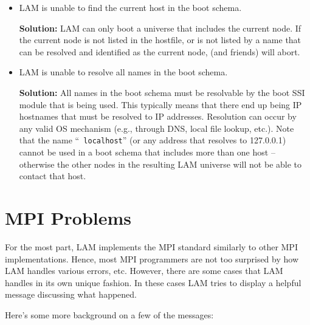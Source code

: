 \begin{itemize}
\item LAM is unable to find the current host in the boot schema.

  {\bf Solution:} LAM can only boot a universe that includes the
  current node.  If the current node is not listed in the hostfile, or
  is not listed by a name that can be resolved and identified as the
  current node,  (and friends) will abort.

\item LAM is unable to resolve all names in the boot schema.

  {\bf Solution:} All names in the boot schema must be resolvable by
  the boot SSI module that is being used.  This typically means that
  there end up being IP hostnames that must be resolved to IP
  addresses.  Resolution can occur by any valid OS mechanism (e.g.,
  through DNS, local file lookup, etc.).  Note that the name ``{\tt
  localhost}'' (or any address that resolves to 127.0.0.1) cannot be
  used in a boot schema that includes more than one host -- otherwise
  the other nodes in the resulting LAM universe will not be able to
  contact that host.
\end{itemize}


\section{MPI Problems}

For the most part, LAM implements the MPI standard similarly to other
MPI implementations.  Hence, most MPI programmers are not too
surprised by how LAM handles various errors, etc.  However, there are
some cases that LAM handles in its own unique fashion.  In these cases
LAM tries to display a helpful message discussing what happened.  

Here's some more background on a few of the messages:

